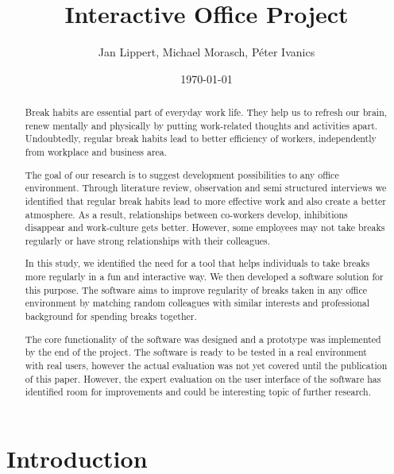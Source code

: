 \documentclass[english]{tktltiki}
\begin{document}
\onehalfspacing

\title{Interactive Office Project}
\author{Jan Lippert, Michael Morasch, P\'eter Ivanics}
\date{\today}

\maketitle


\begin{abstract}
Break habits are essential part of everyday work life. They help us to refresh our brain, renew mentally and physically by putting work-related thoughts and activities apart. Undoubtedly, regular break habits lead to better efficiency of workers, independently from workplace and business area.

The goal of our research is to suggest development possibilities to any office environment. Through literature review, observation and semi structured interviews we identified that regular break habits lead to more effective work and also create a better atmosphere. As a result, relationships between co-workers develop, inhibitions disappear and work-culture gets better. However, some employees may not take breaks regularly or have strong relationships with their colleagues. 

In this study, we identified the need for a tool that helps individuals to take breaks more regularly in a fun and interactive way. We then developed a software solution for this purpose. The software aims to improve regularity of breaks taken in any office environment by matching random colleagues with similar interests and professional background for spending breaks together. 

The core functionality of the software was designed and a prototype was implemented by the end of the project. The software is ready to be tested in a real environment with real users, however the actual evaluation was not yet covered until the publication of this paper. However, the expert evaluation on the user interface of the software has identified room for improvements and could be interesting topic of further research. 
\end{abstract}

\mytableofcontents

\section{Introduction}

\end{document}
